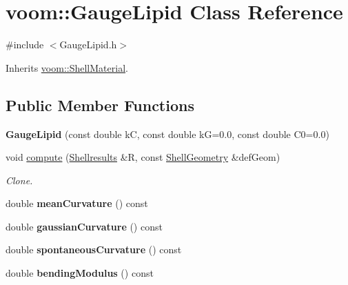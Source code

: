 \hypertarget{classvoom_1_1_gauge_lipid}{
\section{voom::GaugeLipid Class Reference}
\label{classvoom_1_1_gauge_lipid}
}


{\ttfamily \#include $<$GaugeLipid.h$>$}

Inherits \hyperlink{classvoom_1_1_shell_material}{voom::ShellMaterial}.\subsection*{Public Member Functions}
\begin{DoxyCompactItemize}
\item 
\hypertarget{classvoom_1_1_gauge_lipid_aecd144dee6089e89fd19dec43beda3f4}{
{\bfseries GaugeLipid} (const double kC, const double kG=0.0, const double C0=0.0)}
\label{classvoom_1_1_gauge_lipid_aecd144dee6089e89fd19dec43beda3f4}

\item 
void \hyperlink{classvoom_1_1_gauge_lipid_a6df143b4e032baa83cf98cdf00a5d739}{compute} (\hyperlink{structvoom_1_1_shell_material_1_1_shellresults}{Shellresults} \&R, const \hyperlink{classvoom_1_1_shell_geometry}{ShellGeometry} \&defGeom)
\begin{DoxyCompactList}\small\item\em Clone. \item\end{DoxyCompactList}\item 
\hypertarget{classvoom_1_1_gauge_lipid_ae755ee0d19965e38a74b1c8c8ac32e8e}{
double {\bfseries meanCurvature} () const }
\label{classvoom_1_1_gauge_lipid_ae755ee0d19965e38a74b1c8c8ac32e8e}

\item 
\hypertarget{classvoom_1_1_gauge_lipid_a214bafb7339c9fb4eada42bdfbd1b80e}{
double {\bfseries gaussianCurvature} () const }
\label{classvoom_1_1_gauge_lipid_a214bafb7339c9fb4eada42bdfbd1b80e}

\item 
\hypertarget{classvoom_1_1_gauge_lipid_ae4ae8e25f0320ebef624fed2e377a162}{
double {\bfseries spontaneousCurvature} () const }
\label{classvoom_1_1_gauge_lipid_ae4ae8e25f0320ebef624fed2e377a162}

\item 
\hypertarget{classvoom_1_1_gauge_lipid_a10f8a6ef4dfd94144996c93fd34d5725}{
double {\bfseries bendingModulus} () const }
\label{classvoom_1_1_gauge_lipid_a10f8a6ef4dfd94144996c93fd34d5725}


\end{DoxyCompactItemize}
